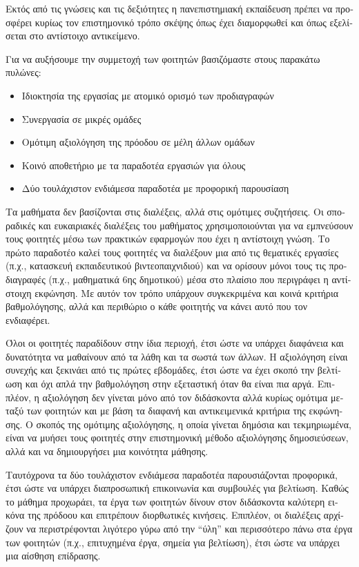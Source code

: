 \documentclass[11pt, a4paper]{article}
\providecommand{\tightlist}{%
  \setlength{\itemsep}{0pt}\setlength{\parskip}{0pt}}
\begin{document}
\begin{greek}
Εκτός από τις γνώσεις και τις δεξιότητες η πανεπιστημιακή εκπαίδευση
πρέπει να προσφέρει κυρίως τον επιστημονικό τρόπο σκέψης όπως έχει
διαμορφωθεί και όπως εξελίσεται στο αντίστοιχο αντικείμενο.

Για να αυξήσουμε την συμμετοχή των φοιτητών βασιζόμαστε στους παρακάτω
πυλώνες:

\begin{itemize}
\tightlist
\item
  Ιδιοκτησία της εργασίας με ατομικό ορισμό των προδιαγραφών
\item
  Συνεργασία σε μικρές ομάδες
\item
  Ομότιμη αξιολόγηση της πρόοδου σε μέλη άλλων ομάδων
\item
  Κοινό αποθετήριο με τα παραδοτέα εργασιών για όλους
\item
  Δύο τουλάχιστον ενδιάμεσα παραδοτέα με προφορική παρουσίαση
\end{itemize}

Τα μαθήματα δεν βασίζονται στις διαλέξεις, αλλά στις ομότιμες
συζητήσεις. Οι σποραδικές και ευκαιριακές διαλέξεις του μαθήματος
χρησιμοποιούνται για να εμπνεύσουν τους φοιτητές μέσω των πρακτικών
εφαρμογών που έχει η αντίστοιχη γνώση. Το πρώτο παραδοτέο καλεί τους
φοιτητές να διαλέξουν μια από τις θεματικές εργασίες (π.χ., κατασκευή
εκπαιδευτικού βιντεοπαιχνιδιού) και να ορίσουν μόνοι τους τις
προδιαγραφές (π.χ., μαθηματικά 6ης δημοτικού) μέσα στο πλαίσιο που
περιγράφει η αντίστοιχη εκφώνηση. Με αυτόν τον τρόπο υπάρχουν
συγκεκριμένα και κοινά κριτήρια βαθμολόγησης, αλλά και περιθώριο ο κάθε
φοιτητής να κάνει αυτό που τον ενδιαφέρει.

Όλοι οι φοιτητές παραδίδουν στην ίδια περιοχή, έτσι ώστε να υπάρχει
διαφάνεια και δυνατότητα να μαθαίνουν από τα λάθη και τα σωστά των
άλλων. Η αξιολόγηση είναι συνεχής και ξεκινάει από τις πρώτες εβδομάδες,
έτσι ώστε να έχει σκοπό την βελτίωση και όχι απλά την βαθμολόγηση στην
εξεταστική όταν θα είναι πια αργά. Επιπλέον, η αξιολόγηση δεν γίνεται
μόνο από τον διδάσκοντα αλλά κυρίως ομότιμα μεταξύ των φοιτητών και με
βάση τα διαφανή και αντικειμενικά κριτήρια της εκφώνησης. Ο σκοπός της
ομότιμης αξιολόγησης, η οποία γίνεται δημόσια και τεκμηριωμένα, είναι να
μυήσει τους φοιτητές στην επιστημονική μέθοδο αξιολόγησης δημοσιεύσεων,
αλλά και να δημιουργήσει μια κοινότητα μάθησης.

Ταυτόχρονα τα δύο τουλάχιστον ενδιάμεσα παραδοτέα παρουσιάζονται
προφορικά, έτσι ώστε να υπάρχει διαπροσωπική επικοινωνία και συμβουλές
για βελτίωση. Καθώς το μάθημα προχωράει, τα έργα των φοιτητών δίνουν
στον διδάσκοντα καλύτερη εικόνα της πρόδοου και επιτρέπουν διορθωτικές
κινήσεις. Επιπλέον, οι διαλέξεις αρχίζουν να περιστρέφονται λιγότερο
γύρω από την ``ύλη'' και περισσότερο πάνω στα έργα των φοιτητών (π.χ.,
επιτυχημένα έργα, σημεία για βελτίωση), έτσι ώστε να υπάρχει μια αίσθηση
επίδρασης.


\end{greek}
\end{document}
